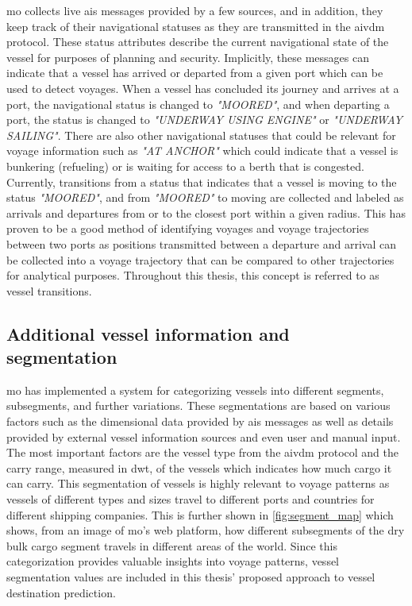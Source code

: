 \acrshort{mo} collects live \acrshort{ais} messages provided by a few sources, and in addition, they keep track of their navigational statuses as they are transmitted in the \gls{aivdm} protocol. These status attributes describe the current navigational state of the vessel for purposes of planning and security. Implicitly, these messages can indicate that a vessel has arrived or departed from a given port which can be used to detect voyages. When a vessel has concluded its journey and arrives at a port, the navigational status is changed to \textit{"MOORED"}, and when departing a port, the status is changed to \textit{"UNDERWAY USING ENGINE"} or \textit{"UNDERWAY SAILING"}. There are also other navigational statuses that could be relevant for voyage information such as \textit{"AT ANCHOR"} which could indicate that a vessel is bunkering (refueling) or is waiting for access to a berth that is congested. Currently, transitions from a status that indicates that a vessel is moving to the status \textit{"MOORED"}, and from \textit{"MOORED"} to moving are collected and labeled as arrivals and departures from or to the closest port within a given radius. This has proven to be a good method of identifying voyages and voyage trajectories between two ports as positions transmitted between a departure and arrival can be collected into a voyage trajectory that can be compared to other trajectories for analytical purposes. Throughout this thesis, this concept is referred to as vessel transitions.

\subsection{Additional vessel information and segmentation}
\label{sec:vessel_info_segments}

\acrshort{mo} has implemented a system for categorizing vessels into different segments, subsegments, and further variations. These segmentations are based on various factors such as the dimensional data provided by \acrshort{ais} messages as well as details provided by external vessel information sources and even user and manual input. The most important factors are the vessel type from the \gls{aivdm} protocol and the carry range, measured in \acrshort{dwt}, of the vessels which indicates how much cargo it can carry. This segmentation of vessels is highly relevant to voyage patterns as vessels of different types and sizes travel to different ports and countries for different shipping companies. This is further shown in \cref{fig:segment_map} which shows, from an image of \acrshort{mo}'s web platform, how different subsegments of the dry bulk cargo segment travels in different areas of the world. Since this categorization provides valuable insights into voyage patterns, vessel segmentation values are included in this thesis' proposed approach to vessel destination prediction.

